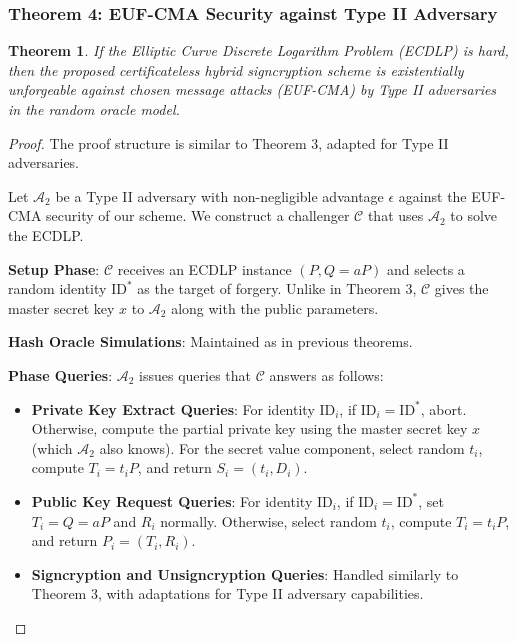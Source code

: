 \documentclass[10pt]{article}
\newtheorem{theorem}{Theorem}
\newtheorem{proof}{Proof}
\begin{document}
\subsubsection{Theorem 4: EUF-CMA Security against Type II Adversary}

\begin{theorem}
If the Elliptic Curve Discrete Logarithm Problem (ECDLP) is hard, then the proposed certificateless hybrid signcryption scheme is existentially unforgeable against chosen message attacks (EUF-CMA) by Type II adversaries in the random oracle model.
\end{theorem}

\begin{proof}
The proof structure is similar to Theorem 3, adapted for Type II adversaries.

Let $\mathcal{A}_2$ be a Type II adversary with non-negligible advantage $\epsilon$ against the EUF-CMA security of our scheme. We construct a challenger $\mathcal{C}$ that uses $\mathcal{A}_2$ to solve the ECDLP.

\textbf{Setup Phase}:
$\mathcal{C}$ receives an ECDLP instance $(P, Q = aP)$ and selects a random identity $\text{ID}^*$ as the target of forgery. Unlike in Theorem 3, $\mathcal{C}$ gives the master secret key $x$ to $\mathcal{A}_2$ along with the public parameters.

\textbf{Hash Oracle Simulations}:
Maintained as in previous theorems.

\textbf{Phase Queries}:
$\mathcal{A}_2$ issues queries that $\mathcal{C}$ answers as follows:

\begin{itemize}
    \item \textbf{Private Key Extract Queries}: For identity $\text{ID}_i$, if $\text{ID}_i = \text{ID}^*$, abort. Otherwise, compute the partial private key using the master secret key $x$ (which $\mathcal{A}_2$ also knows). For the secret value component, select random $t_i$, compute $T_i = t_i P$, and return $S_i = (t_i, D_i)$.
    
    \item \textbf{Public Key Request Queries}: For identity $\text{ID}_i$, if $\text{ID}_i = \text{ID}^*$, set $T_i = Q = aP$ and $R_i$ normally. Otherwise, select random $t_i$, compute $T_i = t_i P$, and return $P_i = (T_i, R_i)$.
    
    \item \textbf{Signcryption and Unsigncryption Queries}: Handled similarly to Theorem 3, with adaptations for Type II adversary capabilities.
\end{itemize}


\end{proof}
\end{document}
